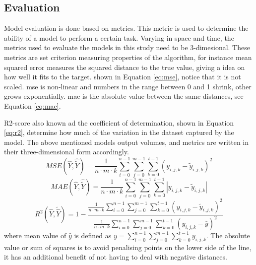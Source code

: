 \subsection{Evaluation} \label{sec:evaluation}
Model evaluation is done based on metrics. This metric is used to determine the ability of a model to perform a certain task. Varying in space and time, the metrics used to evaluate the models in this study need to be 3-dimesional.
These metrics are set criterion measuring properties of the algorithm, for instance mean squared error measures the squared distance to the true value, giving a idea on how well it fits to the target. shown in Equation \eqref{eq:mse}, notice that it is not scaled. \acrshort{mse} is non-linear and numbers in the range between 0 and 1 shrink, other grows exponentially.  \acrfull{mae} is the absolute value between the same distances, see Equation \eqref{eq:mae}. 

R2-score also known ad the coefficient of determination, shown in Equation \eqref{eq:r2},  determine how much of the variation in the dataset captured by the model. The above mentioned models output volumes, and metrics are written in their three-dimensional form accordingly.
\begin{equation} \label{eq:mse}
    MSE(\hat{Y},\hat{\tilde{Y}}) = \frac{1}{n\cdot m \cdot k} \sum_{i=0}^{n-1}\sum_{j=0}^{m-1}\sum_{k=0}^{t-1}(y_{i, j, k}-\tilde{y}_{i, j, k})^2
\end{equation} 
\begin{equation} \label{eq:mae}
    MAE(\hat{Y},\hat{\tilde{Y}}) = \frac{1}{n\cdot m \cdot k} \sum_{i=0}^{n-1}\sum_{j=0}^{m-1}\sum_{k=0}^{t-1}\left|y_{i, j, k}-\tilde{y}_{i, j, k}\right|
\end{equation} 
\begin{equation} \label{eq:r2}
    R^2(\hat{Y}, \tilde{\hat{Y}}) = 1 - \frac{\frac{1}{n\cdot m \cdot k} \sum_{i=0}^{n-1}\sum_{j=0}^{m-1}\sum_{k=0}^{t-1}(y_{i, j, k}-\tilde{y}_{i, j, k})^2}{\frac{1}{n\cdot m \cdot k} \sum_{i=0}^{n-1}\sum_{j=0}^{m-1}\sum_{k=0}^{t-1}(y_{i, j, k}-\bar{y})^2}
\end{equation} 
where mean value of $\hat{y}$ is defined as $\bar{y} =   \sum_{i=0}^{n-1}\sum_{j=0}^{m-1}\sum_{k=0}^{t-1}y_{i, j, k}$. 
The absolute value or sum of squares is to avoid penalising points on the lower side of the line, it has an additional benefit of not having to deal with negative distances. 

